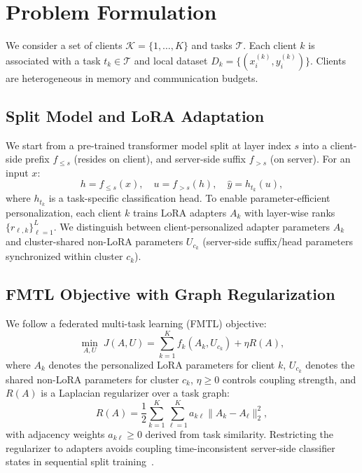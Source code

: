 \documentclass[conference]{IEEEtran}
\begin{document}
\section{Problem Formulation}
\label{sec:problem}

We consider a set of clients $\mathcal{K}=\{1,\dots,K\}$ and tasks $\mathcal{T}$.
Each client $k$ is associated with a task $t_k \in \mathcal{T}$ and local dataset
$D_k=\{(x_i^{(k)}, y_i^{(k)})\}$. Clients are heterogeneous in memory and communication budgets.

\subsection{Split Model and LoRA Adaptation}

We start from a pre-trained transformer model split at layer index $s$ into a client-side prefix $f_{\le s}$ (resides on client), and server-side suffix $f_{> s}$ (on server). For an input $x$:
\begin{equation}
h = f_{\le s}(x), \quad
u = f_{> s}(h), \quad
\hat{y} = h_{t_k}(u),
\end{equation}
where $h_{t_k}$ is a task-specific classification head.
To enable parameter-efficient personalization, each client $k$ trains LoRA adapters $A_k$
with layer-wise ranks $\{r_{\ell,k}\}_{\ell=1}^{L}$. We distinguish between client-personalized adapter parameters $A_k$ and cluster-shared non-LoRA parameters $U_{c_k}$ (server-side suffix/head parameters synchronized within cluster $c_k$).

\subsection{FMTL Objective with Graph Regularization}

We follow a federated multi-task learning (FMTL) objective:
\begin{equation}
\min_{A,U} \; J(A,U) = \sum_{k=1}^K f_k(A_k, U_{c_k}) + \eta R(A),
\label{eq:fmtl_objective}
\end{equation}
where $A_k$ denotes the personalized LoRA parameters for client $k$, $U_{c_k}$ denotes the shared non-LoRA parameters for cluster $c_k$, $\eta\ge 0$ controls coupling strength, and $R(A)$ is a Laplacian regularizer over a task graph:
\begin{equation}
R(A)=\frac{1}{2}\sum_{k=1}^K \sum_{\ell=1}^K a_{k\ell}\lVert A_k-A_\ell\rVert_2^2,
\end{equation}
with adjacency weights $a_{k\ell}\ge 0$ derived from task similarity. Restricting the regularizer to adapters avoids coupling time-inconsistent server-side classifier states in sequential split training~\cite{mira,splitfed,pfedme}.
\end{document}
